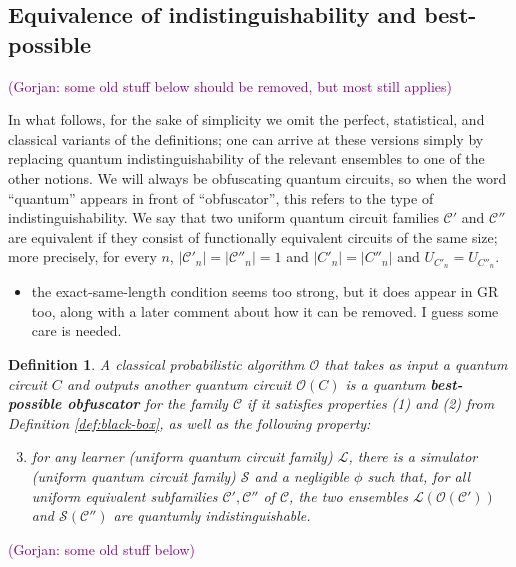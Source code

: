 \documentclass[11pt]{article}
\numberwithin{equation}{section}
\newtheorem{definition}{Definition}
\newcommand{\ga}[1]{{ \textcolor{purple}{(Gorjan:  #1)}}{}}
\begin{document}
{\subsection{Equivalence of indistinguishability and best-possible}

\ga{some old stuff below should be removed, but most still applies}

In what follows, for the sake of simplicity we omit the perfect, statistical, and classical variants of the definitions; one can arrive at these versions simply by replacing quantum indistinguishability of the relevant ensembles to one of the other notions. We will always be obfuscating quantum circuits, so when the word ``quantum'' appears in front of ``obfuscator'', this refers to the type of indistinguishability. We say that two uniform quantum circuit families $\mathcal C'$ and $\mathcal C''$ are equivalent if they consist of functionally equivalent circuits of the same size; more precisely, for every $n$, $|\mathcal C'_n| = |\mathcal C''_n| = 1$ and $|C'_n| = |C''_n|$  and $U_{C'_n} = U_{C''_n}$.

\begin{itemize}
\item the exact-same-length condition seems too strong, but it does appear in GR too, along with a later comment about how it can be removed. I guess some care is needed.
\end{itemize}

\begin{definition} A classical probabilistic algorithm $\mathcal O$ that takes as input a quantum circuit $C$ and outputs another quantum circuit $\mathcal O(C)$ is a quantum {\bf best-possible obfuscator} for the family $\mathcal C$ if it satisfies properties (1) and (2) from Definition \ref{def:black-box}, as well as the following property:
\begin{enumerate}
\setcounter{enumi}{2}
\item for any learner (uniform quantum circuit family) $\mathcal L$, there is a simulator (uniform quantum circuit family) $\mathcal S$ and a negligible $\phi$ such that, for all uniform equivalent subfamilies $\mathcal C', \mathcal C''$ of $\mathcal C$, the two ensembles $\mathcal L(\mathcal O(\mathcal C'))$ and $\mathcal S(\mathcal C'')$ are quantumly indistinguishable.
\end{enumerate}
\end{definition}


\ga{some old stuff below}

}
\end{document}

